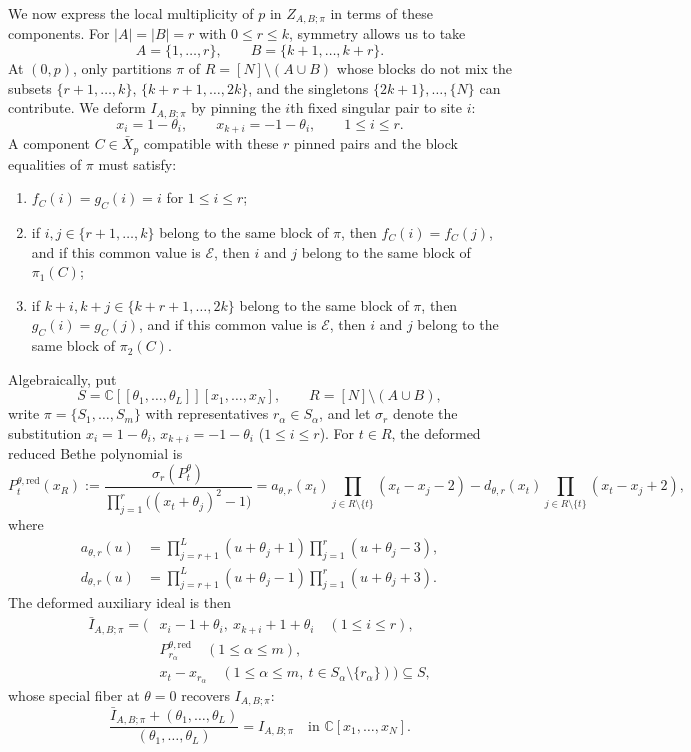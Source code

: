 \documentclass[11pt]{article}
\theoremstyle{definition}
\newcommand{\C}{\mathbb{C}}
\begin{document}
We now express the local multiplicity of $p$ in $Z_{A,B;\pi}$ in terms of
these components. For $|A|=|B|=r$ with $0\le r\le k$, symmetry allows us to take
\[
 A=\{1,\ldots,r\},\qquad B=\{k+1,\ldots,k+r\}.
\]
At $(0,p)$, only partitions $\pi$ of $R=[N]\setminus(A\cup B)$ whose blocks do not mix the subsets
$\{r+1,\ldots,k\}$, $\{k+r+1,\ldots,2k\}$, and the singletons $\{2k+1\},\ldots,\{N\}$ can contribute.
We deform $I_{A,B;\pi}$ by pinning the $i$th fixed singular pair to site $i$:
\[
 x_i=1-\theta_i,\qquad x_{k+i}=-1-\theta_i,\qquad 1\le i\le r.
\]
A component $C\in\bar{X}_p$ compatible with these $r$ pinned pairs and the block equalities of $\pi$ must satisfy:
\begin{enumerate}
 \item $f_C(i)=g_C(i)=i$ for $1\le i\le r$;
 \item if $i,j\in\{r+1,\ldots,k\}$ belong to the same block of $\pi$,
 then $f_C(i)=f_C(j)$, and if this common value is $\mathcal{E}$, then
 $i$ and $j$ belong to the same block of $\pi_1(C)$;
 \item if $k+i,k+j\in\{k+r+1,\ldots,2k\}$ belong to the same block of $\pi$, then
 $g_C(i)=g_C(j)$, and if this common value is $\mathcal{E}$, then
 $i$ and $j$ belong to the same block of $\pi_2(C)$.
\end{enumerate}

Algebraically, put
\[
 S=\C[[\theta_1,\ldots,\theta_L]][x_1,\ldots,x_N],\qquad
 R=[N]\setminus(A\cup B),
\]
write $\pi=\{S_1,\ldots,S_m\}$ with representatives
$r_\alpha\in S_\alpha$, and let $\sigma_r$ denote the substitution $x_i=1-\theta_i$, $x_{k+i}=-1-\theta_i$ ($1\le i\le r$).
For $t\in R$, the deformed reduced Bethe polynomial is
\[
 P_t^{\theta,\mathrm{red}}(x_R)
 :=\frac{\sigma_r(P_t^\theta)}
              {\prod_{j=1}^r\bigl((x_t+\theta_j)^2-1\bigr)}
 =a_{\theta,r}(x_t)\prod_{j\in R\setminus\{t\}}(x_t-x_j-2)
 -d_{\theta,r}(x_t)\prod_{j\in R\setminus\{t\}}(x_t-x_j+2),
\]
where
\[
 \begin{aligned}
 a_{\theta,r}(u)&=\prod_{j=r+1}^L(u+\theta_j+1)
                  \prod_{j=1}^r(u+\theta_j-3),\\
 d_{\theta,r}(u)&=\prod_{j=r+1}^L(u+\theta_j-1)
                  \prod_{j=1}^r(u+\theta_j+3).
 \end{aligned}
\]
The deformed auxiliary ideal is then
\begin{equation}\label{eq:deformed-fixed-partition-ideal}
 \begin{aligned}
 \bar{I}_{A,B;\pi}=\bigl(&x_i-1+\theta_i,\ x_{k+i}+1+\theta_i
                         \quad(1\le i\le r),\\
                       &P_{r_\alpha}^{\theta,\mathrm{red}}
                         \quad(1\le\alpha\le m),\\
                       &x_t-x_{r_\alpha}
                         \quad(1\le\alpha\le m,\
                          t\in S_\alpha\setminus\{r_\alpha\})
                       \bigr)\subseteq S,
 \end{aligned}
\end{equation}
whose special fiber at $\theta=0$ recovers $I_{A,B;\pi}$:
\[
 \frac{\bar{I}_{A,B;\pi}+(\theta_1,\ldots,\theta_L)}
      {(\theta_1,\ldots,\theta_L)}=I_{A,B;\pi}
 \quad\text{in }\C[x_1,\ldots,x_N].
\]
\end{document}
